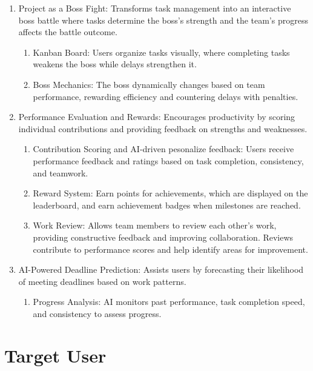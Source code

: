 \begin{enumerate}[leftmargin=80pt]  
    \item Project as a Boss Fight: Transforms task management into an interactive boss battle where tasks determine the boss’s strength and the team's progress affects the battle outcome.  
    \begin{enumerate}  
        \item Kanban Board: Users organize tasks visually, where completing tasks weakens the boss while delays strengthen it.  
        \item Boss Mechanics: The boss dynamically changes based on team performance, rewarding efficiency and countering delays with penalties.  
    \end{enumerate}  

    \item Performance Evaluation and Rewards: Encourages productivity by scoring individual contributions and providing feedback on strengths and weaknesses.  
    \begin{enumerate}  
        \item Contribution Scoring and AI-driven pesonalize feedback: Users receive performance feedback and ratings based on task completion, consistency, and teamwork.  
        \item Reward System: Earn points for achievements, which are displayed on the leaderboard, and earn achievement badges when milestones are reached.  
        \item Work Review: Allows team members to review each other’s work, providing constructive feedback and improving collaboration. Reviews contribute to performance scores and help identify areas for improvement.  
    \end{enumerate}  

    \item AI-Powered Deadline Prediction: Assists users by forecasting their likelihood of meeting deadlines based on work patterns.  
    \begin{enumerate}  
        \item Progress Analysis: AI monitors past performance, task completion speed, and consistency to assess progress.  
    \end{enumerate}  
\end{enumerate}  


\section{Target User}  
\label{section:target-user}  

